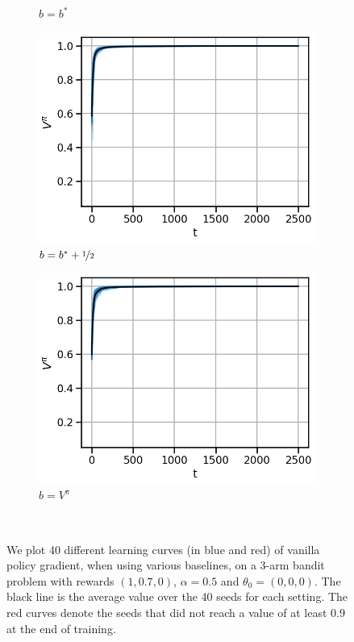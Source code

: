 \begin{figure}[!ht]
\begin{subfigure}[b]{0.245\linewidth}
    \caption{$b = b^\ast$}
  \end{subfigure}
  \begin{subfigure}[b]{0.245\linewidth}
    \includegraphics[width=\textwidth]{articles/baselines/figs/appendix_figs_3arm_000/vanilla_minvar_05_eta=05.png}
    \caption{$b = b^\ast + \nicefrac{1}{2}$}
  \end{subfigure}
  \begin{subfigure}[b]{0.245\linewidth}
    \includegraphics[width=\textwidth]{articles/baselines/figs/appendix_figs_3arm_000/vanilla_value_0_eta=05.png}
    \caption{$b=V^\pi$}
  \end{subfigure}
  \caption{We plot 40 different learning curves (in blue and red) of vanilla policy gradient, when using various baselines, on a 3-arm bandit problem with rewards $(1, 0.7, 0)$, $\alpha = 0.5$ and $\theta_0 = (0, 0, 0)$. The black line is the average value over the 40 seeds for each setting. The red curves denote the seeds that did not reach a value of at least $0.9$ at the end of training.}~\label{appfig:learning_curves_vpg_000}
\end{figure}

